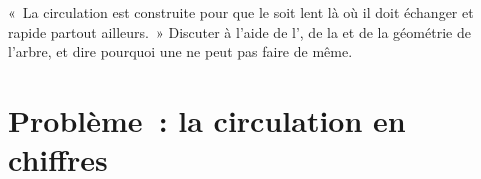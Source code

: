 \begin{exercise}[$\star\star\star$]\label{exo:b2:blood-circulation:12}
«~La circulation est construite pour que le  soit lent là où il doit
échanger et rapide partout ailleurs.~» Discuter à l'aide de l', de la  et de la géométrie de l'arbre, et
dire pourquoi une  ne peut pas faire de même.
\end{exercise}

\section{Problème~: la circulation en chiffres}


